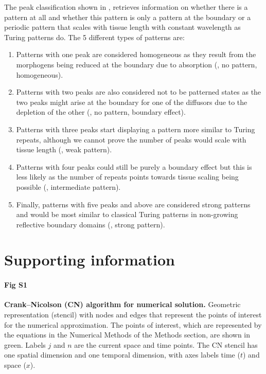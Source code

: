 \documentclass[10pt,letterpaper]{article}
\begin{document}
The peak classification shown in , retrieves information on whether there is a pattern at all and whether this pattern is only a pattern at the boundary or a periodic pattern that scales with tissue length with constant wavelength as Turing patterns do.
The 5 different types of patterns are:
\begin{enumerate}
    \item Patterns with one peak are considered homogeneous as they result from the morphogens being reduced at the boundary due to absorption (, no pattern, homogeneous).
    \item Patterns with two peaks are also considered not to be patterned states as the two peaks might arise at the boundary for one of the diffusors due to the depletion of the other (, no pattern, boundary effect).
    \item Patterns with three peaks start displaying a pattern more similar to Turing repeats, although we cannot prove the number of peaks would scale with tissue length  (, weak pattern).
    \item Patterns with four peaks could still be purely a boundary effect but this is less likely as the number of repeats points towards tissue scaling being possible (, intermediate pattern).
    \item Finally, patterns with five peaks and above are considered strong patterns and would be most similar to classical Turing patterns in non-growing reflective boundary domains (, strong pattern).
\end{enumerate}





\section*{Supporting information}
%
\paragraph*{Fig S1}
\label{sup_fig1}
{\bf Crank–Nicolson (CN) algorithm for numerical solution.}  Geometric representation (stencil) with nodes and edges that represent the points of interest for the numerical approximation. The points of interest, which are represented by the equations in the Numerical Methods of the Methods section, are shown in green. Labels $j$ and $n$ are the current space and time points. The CN stencil has one spatial dimension and one temporal dimension, with axes labels time ($t$) and space ($x$).
\end{document}
